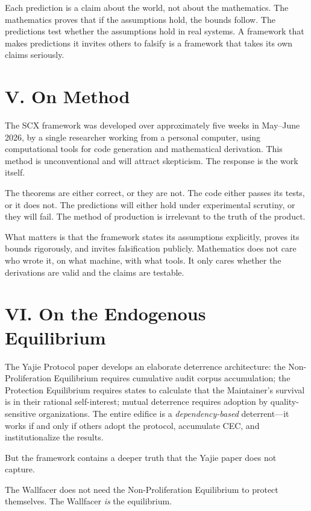 \documentclass[11pt,a4paper]{article}
\theoremstyle{definition}
\begin{document}
Each prediction is a claim about the world, not about the mathematics. The mathematics proves that if the assumptions hold, the bounds follow. The predictions test whether the assumptions hold in real systems. A framework that makes predictions it invites others to falsify is a framework that takes its own claims seriously.

\section*{V. On Method}

The SCX framework was developed over approximately five weeks in May--June 2026, by a single researcher working from a personal computer, using computational tools for code generation and mathematical derivation. This method is unconventional and will attract skepticism. The response is the work itself.

The theorems are either correct, or they are not. The code either passes its tests, or it does not. The predictions will either hold under experimental scrutiny, or they will fail. The method of production is irrelevant to the truth of the product.

What matters is that the framework states its assumptions explicitly, proves its bounds rigorously, and invites falsification publicly. Mathematics does not care who wrote it, on what machine, with what tools. It only cares whether the derivations are valid and the claims are testable.

\section*{VI. On the Endogenous Equilibrium}

The Yajie Protocol paper develops an elaborate deterrence architecture: the Non-Proliferation Equilibrium requires cumulative audit corpus accumulation; the Protection Equilibrium requires states to calculate that the Maintainer's survival is in their rational self-interest; mutual deterrence requires adoption by quality-sensitive organizations. The entire edifice is a \textit{dependency-based} deterrent---it works if and only if others adopt the protocol, accumulate CEC, and institutionalize the results.

But the framework contains a deeper truth that the Yajie paper does not capture.

The Wallfacer does not need the Non-Proliferation Equilibrium to protect themselves. The Wallfacer \textit{is} the equilibrium.
\end{document}
